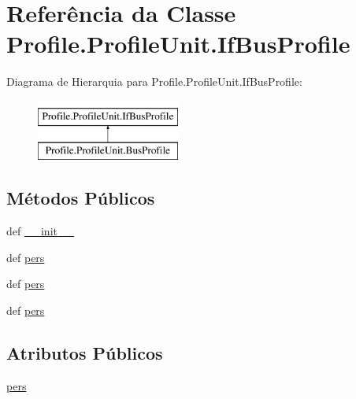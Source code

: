 \hypertarget{classProfile_1_1ProfileUnit_1_1IfBusProfile}{\section{Referência da Classe Profile.\-Profile\-Unit.\-If\-Bus\-Profile}
\label{dc/d47/classProfile_1_1ProfileUnit_1_1IfBusProfile}
}
Diagrama de Hierarquia para Profile.\-Profile\-Unit.\-If\-Bus\-Profile\-:\begin{figure}[H]
\begin{center}
\leavevmode
\includegraphics[height=2.000000cm]{dc/d47/classProfile_1_1ProfileUnit_1_1IfBusProfile}
\end{center}
\end{figure}
\subsection*{Métodos Públicos}
\begin{DoxyCompactItemize}
\item 
def \hyperlink{classProfile_1_1ProfileUnit_1_1IfBusProfile_a3c02bbff4cb54b40edab64d0f9b86a59}{\-\_\-\-\_\-init\-\_\-\-\_\-}
\item 
def \hyperlink{classProfile_1_1ProfileUnit_1_1IfBusProfile_a996592f4b01e0540f45d042065d5a7f4}{pers}
\item 
def \hyperlink{classProfile_1_1ProfileUnit_1_1IfBusProfile_a996592f4b01e0540f45d042065d5a7f4}{pers}
\item 
def \hyperlink{classProfile_1_1ProfileUnit_1_1IfBusProfile_a996592f4b01e0540f45d042065d5a7f4}{pers}
\end{DoxyCompactItemize}
\subsection*{Atributos Públicos}
\begin{DoxyCompactItemize}
\item 
\hyperlink{classProfile_1_1ProfileUnit_1_1IfBusProfile_abe265adaf3fd39d6534f9ad4c9ba8abb}{pers}
\end{DoxyCompactItemize}


